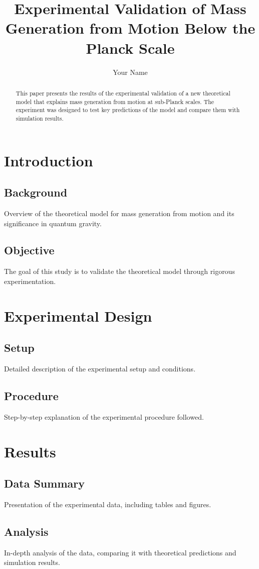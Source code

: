 \documentclass{article}
\title{Experimental Validation of Mass Generation from Motion Below the Planck Scale}
\author{Your Name}
\begin{document}
\maketitle

\begin{abstract}
This paper presents the results of the experimental validation of a new theoretical model that explains mass generation from motion at sub-Planck scales. The experiment was designed to test key predictions of the model and compare them with simulation results.
\end{abstract}

\section{Introduction}
\subsection{Background}
Overview of the theoretical model for mass generation from motion and its significance in quantum gravity.
\subsection{Objective}
The goal of this study is to validate the theoretical model through rigorous experimentation.

\section{Experimental Design}
\subsection{Setup}
Detailed description of the experimental setup and conditions.
\subsection{Procedure}
Step-by-step explanation of the experimental procedure followed.

\section{Results}
\subsection{Data Summary}
Presentation of the experimental data, including tables and figures.
\subsection{Analysis}
In-depth analysis of the data, comparing it with theoretical predictions and simulation results.
\end{document}
